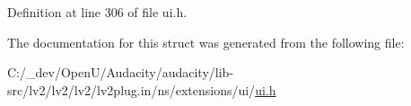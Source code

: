 Definition at line 306 of file ui.\+h.



The documentation for this struct was generated from the following file\+:\begin{DoxyCompactItemize}
\item 
C\+:/\+\_\+dev/\+Open\+U/\+Audacity/audacity/lib-\/src/lv2/lv2/lv2/lv2plug.\+in/ns/extensions/ui/\hyperlink{ui_8h}{ui.\+h}\end{DoxyCompactItemize}
